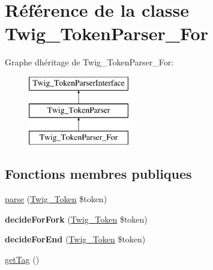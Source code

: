 \hypertarget{class_twig___token_parser___for}{}\section{Référence de la classe Twig\+\_\+\+Token\+Parser\+\_\+\+For}
\label{class_twig___token_parser___for}
Graphe d\textquotesingle{}héritage de Twig\+\_\+\+Token\+Parser\+\_\+\+For\+:\begin{figure}[H]
\begin{center}
\leavevmode
\includegraphics[height=3.000000cm]{class_twig___token_parser___for}
\end{center}
\end{figure}
\subsection*{Fonctions membres publiques}
\begin{DoxyCompactItemize}
\item 
\hyperlink{class_twig___token_parser___for_a5dfa2e269321584fb74e8b43dabe0efd}{parse} (\hyperlink{class_twig___token}{Twig\+\_\+\+Token} \$token)
\item 
{\bfseries decide\+For\+Fork} (\hyperlink{class_twig___token}{Twig\+\_\+\+Token} \$token)\hypertarget{class_twig___token_parser___for_a53cc6e3346ab6c7b7afd287b1353b4e5}{}\label{class_twig___token_parser___for_a53cc6e3346ab6c7b7afd287b1353b4e5}

\item 
{\bfseries decide\+For\+End} (\hyperlink{class_twig___token}{Twig\+\_\+\+Token} \$token)\hypertarget{class_twig___token_parser___for_a812ad30964fe8ea7ce0e972526ec4f7f}{}\label{class_twig___token_parser___for_a812ad30964fe8ea7ce0e972526ec4f7f}

\item 
\hyperlink{class_twig___token_parser___for_ab86ba36154b20e6bbfa3ba705f12f9d6}{get\+Tag} ()
\end{DoxyCompactItemize}

